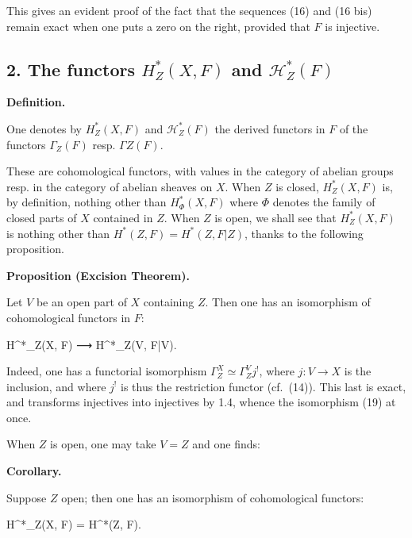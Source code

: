 \documentclass[
]{article}
\newenvironment{Shaded}{}{}
\newcommand{\NormalTok}[1]{#1}
\begin{document}
This gives an evident proof of the fact that the sequences (16) and (16
bis) remain exact when one puts a zero on the right, provided that \(F\)
is injective.

\subsection{\texorpdfstring{2. The functors \(H^{*}_{Z}(X, F)\) and
\(\mathcal{H}^{*}_{Z}(F)\)}{2. The functors H\^{}\{*\}\_\{Z\}(X, F) and \textbackslash mathcal\{H\}\^{}\{*\}\_\{Z\}(F)}}\label{the-functors-h_zx-f-and-mathcalh_zf}

\textbf{Definition.}

One denotes by \(H^{*}_{Z}(X, F)\) and \(\mathcal{H}^{*}_{Z}(F)\) the
derived functors in \(F\) of the functors \(\Gamma_{Z}(F)\) resp.
\(\Gamma Z(F)\).

These are cohomological functors, with values in the category of abelian
groups resp. in the category of abelian sheaves on \(X\). When \(Z\) is
closed, \(H^{*}_{Z}(X, F)\) is, by definition, nothing other than
\(H^{*}_{\Phi}(X, F)\) where \(\Phi\) denotes the family of closed parts
of \(X\) contained in \(Z\). When \(Z\) is open, we shall see that
\(H^{*}_{Z}(X, F)\) is nothing other than
\(H^{*}(Z, F) = H^{*}(Z, F|Z)\), thanks to the following proposition.

\textbf{Proposition (Excision Theorem).}

Let \(V\) be an open part of \(X\) containing \(Z\). Then one has an
isomorphism of cohomological functors in \(F\):

\begin{Shaded}
\begin{Highlighting}[]
\NormalTok{H\^{}*\_Z(X, F) ⟶ H\^{}*\_Z(V, F|V).}
\end{Highlighting}
\end{Shaded}

Indeed, one has a functorial isomorphism
\(\Gamma^{X}_{Z} \simeq \Gamma^{V}_{Z} j^{!}\), where \(j: V \to X\) is
the inclusion, and where \(j^{!}\) is thus the restriction functor
(cf.~(14)). This last is exact, and transforms injectives into
injectives by 1.4, whence the isomorphism (19) at once.

When \(Z\) is open, one may take \(V = Z\) and one finds:

\textbf{Corollary.}

Suppose \(Z\) open; then one has an isomorphism of cohomological
functors:

\begin{Shaded}
\begin{Highlighting}[]
\NormalTok{H\^{}*\_Z(X, F) = H\^{}*(Z, F).}
\end{Highlighting}
\end{Shaded}
\end{document}
